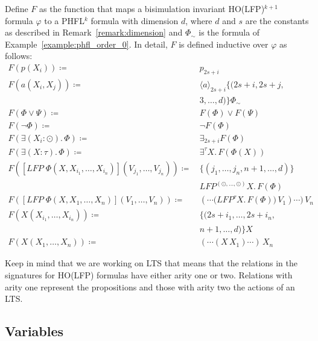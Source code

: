 \begin{definition}
    \label{definition:lower_bounds_phfl_formula_function}
   Define $F$ as the function that maps a bisimulation invariant HO(LFP)$^{k+1}$ formula $\varphi$ to a PHFL$^k$ formula with dimension $d$, where $d$ and $s$ are the constants as described in Remark~\ref{remark:dimension} and $\Phi_\sim$ is the formula of Example~\ref{example:phfl_order_0}. In detail, $F$ is defined
    inductive over $\varphi$ as follows:
    \begin{align*}
        F(p(X_i)) \coloneqq &\, p_{2s+i} \\
        F(a(X_i, X_j)) \coloneqq &\, \langle a \rangle_{2s+i} \{(2s+i, 2s+j, \\
        &\,3, \dots, d)\} \Phi_\sim \\
        F(\Phi \vee \Psi) \coloneqq &\, F(\Phi) \vee F(\Psi) \\
        F(\neg \Phi) \coloneqq &\, \neg F(\Phi) \\
        F(\exists (X_i \colon \odot).\,\Phi) \coloneqq &\, \exists_{2s+i} F(\Phi) \\
        F(\exists (X \colon \tau).\,\Phi) \coloneqq &\, \exists^\tau X.\,F(\Phi(X)) \\
        F([LFP\;\Phi(X, X_{i_1}, \dots, X_{i_n})](V_{j_1}, \dots, V_{j_n})) \coloneqq &\,\{(j_1, \dots, j_n, n + 1, \dots, d)\} \\
        &\,LFP^{(\odot, \dots, \odot)} X.\, F(\Phi) \\
        F([LFP\;\Phi(X, X_1, \dots, X_n)](V_1, \dots, V_n)) \coloneqq &\,(\dotsb \big(LFP^\tau X.\, F(\Phi)\big)\,V_1)\dotsb)\,V_n \\
        F(X(X_{i_1}, \dots, X_{i_n})) \coloneqq &\, \{(2s+i_1, \dots, 2s+i_n, \\
        &\,n + 1, \dots, d)\}X\\
        F(X(X_1, \dots, X_n)) \coloneqq &\, (\dotsb (X\,X_1)\dotsb)\,X_n
    \end{align*}
\end{definition}
Keep in mind that we are working on LTS that means that the relations in the signatures for HO(LFP) formulas have either arity one or two. Relations with arity one represent the 
propositions and those with arity two the actions of an LTS.

\subsection{Variables}\label{subsec:lower_bounds_variables}

